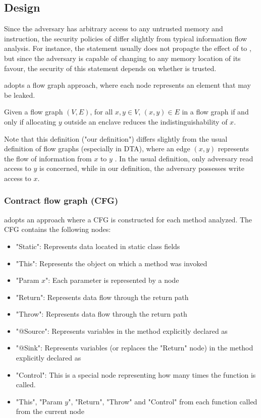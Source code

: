 \subsection{Design}
Since the adversary has arbitrary access to any untrusted memory and instruction,
the security policies of \pname{} differ slightly from typical information flow analysis.
For instance, the statement  usually
does not propagte the effect of  to ,
but since the adversary is capable of changing  to any memory location of its favour,
the security of this statement depends on whether  is trusted.

\pname{} adopts a flow graph approach,
where each node represents an element that may be leaked.

\begin{defin}
	Given a flow graph $(V, E)$, for all $x, y \in V$,
	$(x, y) \in E$ in a flow graph if and only if
	allocating $y$ outside an enclave reduces the indistinguishability of $x$.
\end{defin}

Note that this definition ("our definition") differs slightly from
the usual definition of flow graphs (especially in DTA),
where an edge $(x, y)$ represents the flow of information from $x$ to $y$ \cite{YinHeng2007Pcsi}.
In the usual definition, only adversary read access to $y$ is concerned,
while in our definition, the adversary possesses write access to $x$.

\subsubsection{Contract flow graph (CFG)}
\pname{} adopts an approach where a CFG is constructed for each method analyzed.
The CFG contains the following nodes:
\begin{itemize}
	\item "Static": Represents data located in static class fields
	\item "This": Represents the object on which a method was invoked
	\item "Param $x$": Each parameter is represented by a node
	\item "Return": Represents data flow through the return path
	\item "Throw": Represents data flow through the return path
	\item "@Source": Represents variables in the method explicitly declared as 
	\item "@Sink": Represents variables (or replaces the "Return" node)
		in the method explicitly declared as 
	\item "Control": This is a special node representing how many times the function is called.
	\item "This", "Param $y$", "Return", "Throw" and "Control"
		from each function called from the current node
\end{itemize}

